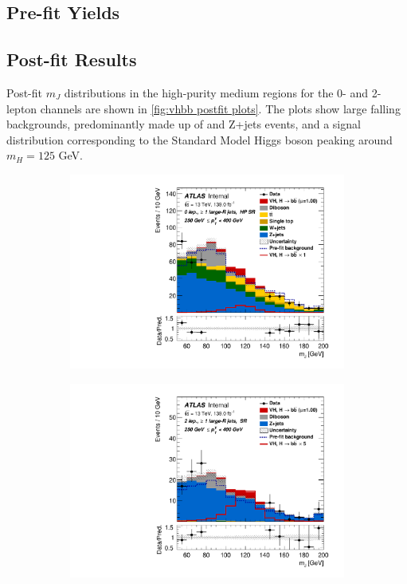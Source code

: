 \subsection{Pre-fit Yields}


\subsection{Post-fit Results}

Post-fit $m_J$ distributions in the high-purity medium \pTV regions for the 0- and 2-lepton channels are shown in \cref{fig:vhbb postfit plots}. The plots show large falling backgrounds, predominantly made up of \Wjets and Z+jets events, and a signal distribution corresponding to the Standard Model Higgs boson peaking around $m_H = 125$ GeV.

\begin{figure}[!htbp]
  \centering
  \begin{subfigure}{.4\textwidth}
    \centering
    \includegraphics[width=\textwidth]{chapters/6.vhbb_boosted/figs/Region_BMax400_BMin250_incFat1_Fat1_Y6051_DSRnoaddbjetsr_T2_L0_distmBB_J0_GlobalFit_conditionnal_mu1.pdf}
  \end{subfigure}%
  \begin{subfigure}{.4\textwidth}
    \centering
    \includegraphics[width=\textwidth]{chapters/6.vhbb_boosted/figs/Region_distmBB_J0_L2_T2_DSR_Y6051_incJet1_Fat1_incFat1_BMin250_BMax400_GlobalFit_conditionnal_mu1.pdf}

\end{subfigure}
\end{figure}
